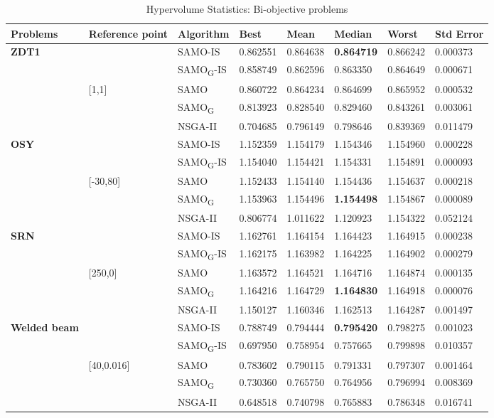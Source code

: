 \begin{table*}[!ht]\scriptsize 
	\centering 
	\caption{Hypervolume Statistics: Bi-objective problems}
	\begin{tabular}{|l|l|l|l|l|l|l|l|} 
		\noalign{\smallskip}\hline 
		\textbf{Problems} & \textbf{Reference point} & \textbf{Algorithm} & \textbf{Best} & \textbf{Mean} & \textbf{Median} & \textbf{Worst} & \textbf{Std Error} \\ \hline 
		\multirow{5}{*}{\textbf{ZDT1}} & & SAMO-IS & 0.862551 & 0.864638 & \textbf{0.864719} & 0.866242 & 0.000373 \\ 
		& & SAMO\textsubscript{G}-IS & 0.858749 & 0.862596 & 0.863350 & 0.864649 & 0.000671 \\ 
		& [1,1] & SAMO & 0.860722 & 0.864234 & 0.864699 & 0.865952 & 0.000532 \\ 
		& & SAMO\textsubscript{G} & 0.813923 & 0.828540 & 0.829460 & 0.843261 & 0.003061 \\ 
		& & NSGA-II & 0.704685 & 0.796149 & 0.798646 & 0.839369 & 0.011479 \\ \hline
		\multirow{5}{*}{\textbf{OSY}} & & SAMO-IS & 1.152359 & 1.154179 & 1.154346 & 1.154960 & 0.000228 \\
		& & SAMO\textsubscript{G}-IS & 1.154040 & 1.154421 & 1.154331 & 1.154891 & 0.000093 \\
		& [-30,80] & SAMO & 1.152433 & 1.154140 & 1.154436 & 1.154637 & 0.000218 \\
		& & SAMO\textsubscript{G} & 1.153963 & 1.154496 & \textbf{1.154498} & 1.154867 & 0.000089 \\
		& & NSGA-II & 0.806774 & 1.011622 & 1.120923 & 1.154322 & 0.052124 \\ \hline 
		\multirow{5}{*}{\textbf{SRN}} & & SAMO-IS & 1.162761 & 1.164154 & 1.164423 & 1.164915 & 0.000238 \\
		& & SAMO\textsubscript{G}-IS & 1.162175 & 1.163982 & 1.164225 & 1.164902 & 0.000279 \\ 
		& [250,0] & SAMO & 1.163572 & 1.164521 & 1.164716 & 1.164874 & 0.000135 \\ 
		& & SAMO\textsubscript{G} & 1.164216 & 1.164729 & \textbf{1.164830} & 1.164918 & 0.000076 \\ 
		& & NSGA-II & 1.150127 & 1.160346 & 1.162513 & 1.164287 & 0.001497 \\ \hline 
		\multirow{5}{*}{\textbf{Welded beam}} & & SAMO-IS & 0.788749 & 0.794444 & \textbf{0.795420} & 0.798275 & 0.001023 \\ 
		& & SAMO\textsubscript{G}-IS & 0.697950 & 0.758954 & 0.757665 & 0.799898 & 0.010357 \\
		& [40,0.016] & SAMO & 0.783602 & 0.790115 & 0.791331 & 0.797307 & 0.001464 \\
		& & SAMO\textsubscript{G} & 0.730360 & 0.765750 & 0.764956 & 0.796994 & 0.008369 \\
		& & NSGA-II & 0.648518 & 0.740798 & 0.765883 & 0.786348 & 0.016741 \\ \hline 
	\end{tabular} 
	\label{tab:hvstat1}
\end{table*}


